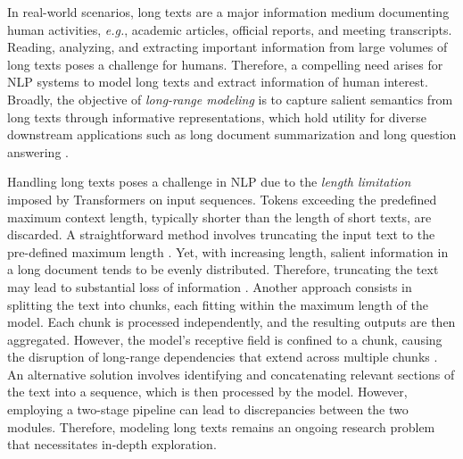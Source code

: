 In real-world scenarios, long texts are a major information medium documenting human activities, \textit{e.g.}, academic articles, official reports, and meeting transcripts. Reading, analyzing, and extracting important information from large volumes of long texts poses a challenge for humans. Therefore, a compelling need arises for \ac{NLP} systems to model long texts and extract information of human interest. Broadly, the objective of \emph{long-range modeling} is to capture salient semantics from long texts through informative representations, which hold utility for diverse downstream applications such as long document summarization \citep{cohan2018discourse, sharma2019bigpatent} and long question answering \citep{dasigi2021dataset}.

Handling long texts poses a challenge in \ac{NLP} due to the \textit{length limitation} imposed by Transformers on input sequences. Tokens exceeding the predefined maximum context length, typically shorter than the length of short texts, are discarded. A straightforward method involves truncating the input text to the pre-defined maximum length \citep{lewis2019bart}. Yet, with increasing length, salient information in a long document tends to be evenly distributed. Therefore, truncating the text may lead to substantial loss of information \citep{koh2022empirical}. Another approach consists in splitting the text into chunks, each fitting within the maximum length of the model. Each chunk is processed independently, and the resulting outputs are then aggregated. However, the model's receptive field is confined to a chunk, causing the disruption of long-range dependencies that extend across multiple chunks \citep{ding2020cogltx}. An alternative solution involves identifying and concatenating relevant sections of the text into a sequence, which is then processed by the model. However, employing a two-stage pipeline can lead to discrepancies between the two modules.
Therefore, modeling long texts remains an ongoing research problem that necessitates in-depth exploration.

